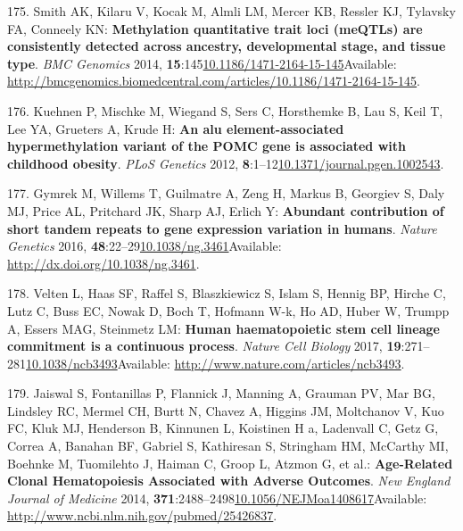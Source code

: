 \documentclass[
]{book}
\begin{document}
\leavevmode\hypertarget{ref-Smith2014a}{}%
175. Smith AK, Kilaru V, Kocak M, Almli LM, Mercer KB, Ressler KJ, Tylavsky FA, Conneely KN: \textbf{Methylation quantitative trait loci (meQTLs) are consistently detected across ancestry, developmental stage, and tissue type}. \emph{BMC Genomics} 2014, \textbf{15}:145\href{https://doi.org/10.1186/1471-2164-15-145}{10.1186/1471-2164-15-145}Available: \url{http://bmcgenomics.biomedcentral.com/articles/10.1186/1471-2164-15-145}.

\leavevmode\hypertarget{ref-Kuehnen2012}{}%
176. Kuehnen P, Mischke M, Wiegand S, Sers C, Horsthemke B, Lau S, Keil T, Lee YA, Grueters A, Krude H: \textbf{An alu element-associated hypermethylation variant of the POMC gene is associated with childhood obesity}. \emph{PLoS Genetics} 2012, \textbf{8}:1--12\href{https://doi.org/10.1371/journal.pgen.1002543}{10.1371/journal.pgen.1002543}.

\leavevmode\hypertarget{ref-Gymrek2015}{}%
177. Gymrek M, Willems T, Guilmatre A, Zeng H, Markus B, Georgiev S, Daly MJ, Price AL, Pritchard JK, Sharp AJ, Erlich Y: \textbf{Abundant contribution of short tandem repeats to gene expression variation in humans}. \emph{Nature Genetics} 2016, \textbf{48}:22--29\href{https://doi.org/10.1038/ng.3461}{10.1038/ng.3461}Available: \url{http://dx.doi.org/10.1038/ng.3461}.

\leavevmode\hypertarget{ref-Velten2017}{}%
178. Velten L, Haas SF, Raffel S, Blaszkiewicz S, Islam S, Hennig BP, Hirche C, Lutz C, Buss EC, Nowak D, Boch T, Hofmann W-k, Ho AD, Huber W, Trumpp A, Essers MAG, Steinmetz LM: \textbf{Human haematopoietic stem cell lineage commitment is a continuous process}. \emph{Nature Cell Biology} 2017, \textbf{19}:271--281\href{https://doi.org/10.1038/ncb3493}{10.1038/ncb3493}Available: \url{http://www.nature.com/articles/ncb3493}.

\leavevmode\hypertarget{ref-Jaiswal2014}{}%
179. Jaiswal S, Fontanillas P, Flannick J, Manning A, Grauman PV, Mar BG, Lindsley RC, Mermel CH, Burtt N, Chavez A, Higgins JM, Moltchanov V, Kuo FC, Kluk MJ, Henderson B, Kinnunen L, Koistinen H a, Ladenvall C, Getz G, Correa A, Banahan BF, Gabriel S, Kathiresan S, Stringham HM, McCarthy MI, Boehnke M, Tuomilehto J, Haiman C, Groop L, Atzmon G, et al.: \textbf{Age-Related Clonal Hematopoiesis Associated with Adverse Outcomes}. \emph{New England Journal of Medicine} 2014, \textbf{371}:2488--2498\href{https://doi.org/10.1056/NEJMoa1408617}{10.1056/NEJMoa1408617}Available: \url{http://www.ncbi.nlm.nih.gov/pubmed/25426837}.
\end{document}
